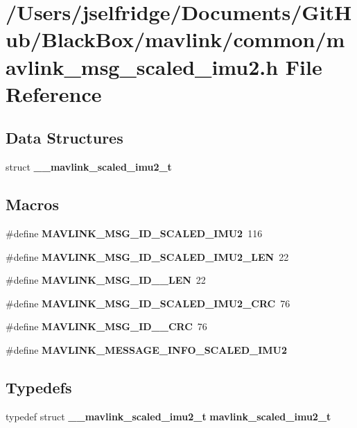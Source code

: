 \section{/\+Users/jselfridge/\+Documents/\+Git\+Hub/\+Black\+Box/mavlink/common/mavlink\+\_\+msg\+\_\+scaled\+\_\+imu2.h File Reference}
\label{mavlink__msg__scaled__imu2_8h}
\subsection*{Data Structures}
\begin{DoxyCompactItemize}
\item 
struct \textbf{ \+\_\+\+\_\+mavlink\+\_\+scaled\+\_\+imu2\+\_\+t}
\end{DoxyCompactItemize}
\subsection*{Macros}
\begin{DoxyCompactItemize}
\item 
\#define \textbf{ M\+A\+V\+L\+I\+N\+K\+\_\+\+M\+S\+G\+\_\+\+I\+D\+\_\+\+S\+C\+A\+L\+E\+D\+\_\+\+I\+M\+U2}~116
\item 
\#define \textbf{ M\+A\+V\+L\+I\+N\+K\+\_\+\+M\+S\+G\+\_\+\+I\+D\+\_\+\+S\+C\+A\+L\+E\+D\+\_\+\+I\+M\+U2\+\_\+\+L\+EN}~22
\item 
\#define \textbf{ M\+A\+V\+L\+I\+N\+K\+\_\+\+M\+S\+G\+\_\+\+I\+D\+\_\+\_\+\+L\+EN}~22
\item 
\#define \textbf{ M\+A\+V\+L\+I\+N\+K\+\_\+\+M\+S\+G\+\_\+\+I\+D\+\_\+\+S\+C\+A\+L\+E\+D\+\_\+\+I\+M\+U2\+\_\+\+C\+RC}~76
\item 
\#define \textbf{ M\+A\+V\+L\+I\+N\+K\+\_\+\+M\+S\+G\+\_\+\+I\+D\+\_\+\_\+\+C\+RC}~76
\item 
\#define \textbf{ M\+A\+V\+L\+I\+N\+K\+\_\+\+M\+E\+S\+S\+A\+G\+E\+\_\+\+I\+N\+F\+O\+\_\+\+S\+C\+A\+L\+E\+D\+\_\+\+I\+M\+U2}
\end{DoxyCompactItemize}
\subsection*{Typedefs}
\begin{DoxyCompactItemize}
\item 
typedef struct \textbf{ \+\_\+\+\_\+mavlink\+\_\+scaled\+\_\+imu2\+\_\+t} \textbf{ mavlink\+\_\+scaled\+\_\+imu2\+\_\+t}
\end{DoxyCompactItemize}


